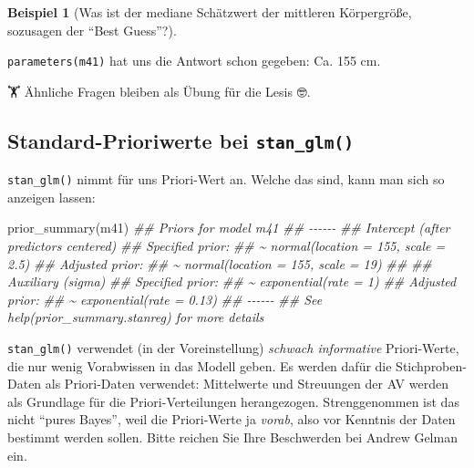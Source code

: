 \documentclass[
  a4paper,
  DIV=11]{scrreprt}
\newenvironment{Shaded}{\begin{snugshade}}{\end{snugshade}}
\newcommand{\DocumentationTok}[1]{\textcolor[rgb]{0.37,0.37,0.37}{\textit{#1}}}
\newcommand{\FunctionTok}[1]{\textcolor[rgb]{0.28,0.35,0.67}{#1}}
\newcommand{\NormalTok}[1]{\textcolor[rgb]{0.00,0.23,0.31}{#1}}
\theoremstyle{definition}
\newtheorem{example}{Beispiel}[chapter]
\theoremstyle{remark}
\begin{document}
\leavevmode{}%
\begin{example}[Was ist der mediane Schätzwert der mittleren
Körpergröße, sozusagen der ``Best Guess''?]\label{exm-kung6}

\texttt{parameters(m41)} hat uns die Antwort schon gegeben: Ca. 155 cm.

\end{example}

🏋️ Ähnliche Fragen bleiben als Übung für die Lesis 🤓.

\hypertarget{standard-prioriwerte-bei-stan_glm}{%
\subsection{\texorpdfstring{Standard-Prioriwerte bei
\texttt{stan\_glm()}}{Standard-Prioriwerte bei stan\_glm()}}\label{standard-prioriwerte-bei-stan_glm}}

\texttt{stan\_glm()} nimmt für uns Priori-Wert an. Welche das sind, kann
man sich so anzeigen lassen:

\begin{Shaded}
\begin{Highlighting}[]
\FunctionTok{prior\_summary}\NormalTok{(m41)}
\DocumentationTok{\#\# Priors for model \textquotesingle{}m41\textquotesingle{} }
\DocumentationTok{\#\# {-}{-}{-}{-}{-}{-}}
\DocumentationTok{\#\# Intercept (after predictors centered)}
\DocumentationTok{\#\#   Specified prior:}
\DocumentationTok{\#\#     \textasciitilde{} normal(location = 155, scale = 2.5)}
\DocumentationTok{\#\#   Adjusted prior:}
\DocumentationTok{\#\#     \textasciitilde{} normal(location = 155, scale = 19)}
\DocumentationTok{\#\# }
\DocumentationTok{\#\# Auxiliary (sigma)}
\DocumentationTok{\#\#   Specified prior:}
\DocumentationTok{\#\#     \textasciitilde{} exponential(rate = 1)}
\DocumentationTok{\#\#   Adjusted prior:}
\DocumentationTok{\#\#     \textasciitilde{} exponential(rate = 0.13)}
\DocumentationTok{\#\# {-}{-}{-}{-}{-}{-}}
\DocumentationTok{\#\# See help(\textquotesingle{}prior\_summary.stanreg\textquotesingle{}) for more details}
\end{Highlighting}
\end{Shaded}

\texttt{stan\_glm()} verwendet (in der Voreinstellung) \emph{schwach
informative} Priori-Werte, die nur wenig Vorabwissen in das Modell
geben. Es werden dafür die Stichproben-Daten als Priori-Daten verwendet:
Mittelwerte und Streuungen der AV werden als Grundlage für die
Priori-Verteilungen herangezogen. Strenggenommen ist das nicht ``pures
Bayes'', weil die Priori-Werte ja \emph{vorab}, also vor Kenntnis der
Daten bestimmt werden sollen. Bitte reichen Sie Ihre Beschwerden bei
Andrew Gelman ein.
\end{document}
